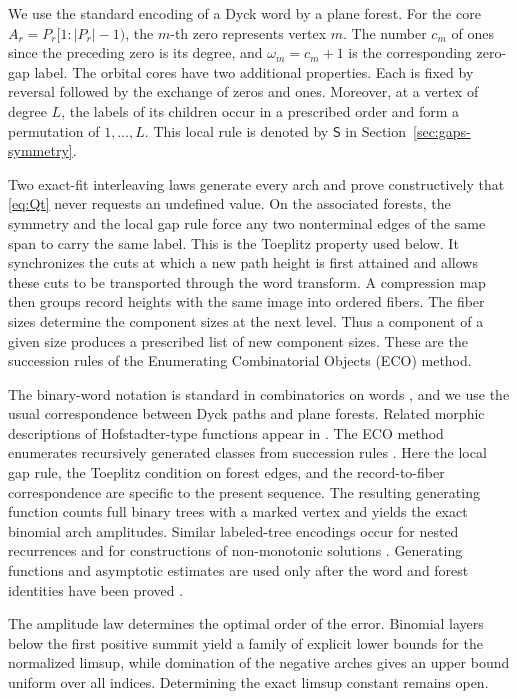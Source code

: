 \documentclass[11pt]{article}
\theoremstyle{definition}
\theoremstyle{remark}
\begin{document}
We use the standard encoding of a Dyck word by a plane forest.  For the core
\(A_r=P_r[1:|P_r|-1)\), the \(m\)-th zero represents vertex \(m\).  The
number \(c_m\) of ones since the preceding zero is its degree, and
\(\omega_m=c_m+1\) is the corresponding zero-gap label.  The orbital cores
have two additional properties.  Each is
fixed by reversal followed by the exchange of zeros and ones.  Moreover, at a
vertex of degree \(L\), the labels of its children occur in a prescribed order
and form a permutation of \(1,\ldots,L\).  This local rule is denoted by
\(\mathsf S\) in Section~\ref{sec:gaps-symmetry}.

Two exact-fit interleaving laws generate every arch and prove constructively
that \eqref{eq:Qt} never requests an undefined value.  On the associated
forests, the symmetry and the local gap rule force any two nonterminal edges
of the same span to carry the same label.  This is the Toeplitz property used
below.  It synchronizes the cuts at which a new path height is first attained
and allows these cuts to be transported through the word transform.  A
compression map then groups record heights with the same image into ordered
fibers.  The fiber sizes determine the component sizes at the next level.
Thus a component of a given size produces a prescribed list of new component
sizes.  These are the succession rules of the Enumerating Combinatorial
Objects (ECO) method.

The binary-word notation is standard in combinatorics on words
\cite{Lothaire02}, and we use the usual correspondence between Dyck paths and
plane forests.  Related morphic descriptions of Hofstadter-type functions
appear in \cite{LLS26,Shallit25}.  The ECO method enumerates
recursively generated classes from succession rules \cite{Barcucci99}.  Here
the local gap rule, the Toeplitz condition on forest edges, and the
record-to-fiber correspondence are specific to the present sequence.  The
resulting generating function counts full binary trees with a marked vertex
and yields the exact binomial arch amplitudes.  Similar labeled-tree encodings
occur for nested recurrences \cite{JR05,Fox22} and for constructions of
non-monotonic solutions \cite{SunoharaTannyVerberne19}.
Generating functions and asymptotic estimates are used only after the word
and forest identities have been proved \cite{FlajoletSedgewick09}.

The amplitude law determines the optimal order of the error.  Binomial layers
below the first positive summit yield a family of explicit lower bounds for
the normalized limsup, while domination of the negative arches gives an upper
bound uniform over all indices.  Determining the exact limsup constant remains
open.
\end{document}
